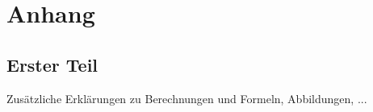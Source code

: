 \chapter{Anhang}
\section{Erster Teil}
\label{Abs:anhang_1}

Zusätzliche Erklärungen zu Berechnungen und Formeln, Abbildungen, ...